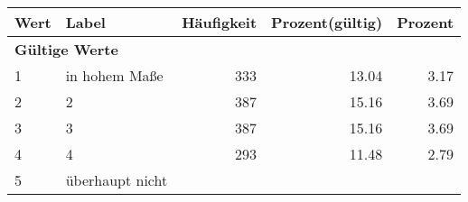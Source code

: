      \begin{longtable}{lXrrr}
     \toprule
     \textbf{Wert} & \textbf{Label} & \textbf{Häufigkeit} & \textbf{Prozent(gültig)} & \textbf{Prozent} \\
     \endhead
     \midrule
     \multicolumn{5}{l}{\textbf{Gültige Werte}}\\

     1 &
     \multicolumn{1}{X}{ in hohem Maße   } &


       \num{333} &
       \num[round-mode=places,round-precision=2]{13,04} &
         \num[round-mode=places,round-precision=2]{3,17} \\

     2 &
     \multicolumn{1}{X}{ 2   } &


       \num{387} &
       \num[round-mode=places,round-precision=2]{15,16} &
         \num[round-mode=places,round-precision=2]{3,69} \\

     3 &
     \multicolumn{1}{X}{ 3   } &


       \num{387} &
       \num[round-mode=places,round-precision=2]{15,16} &
         \num[round-mode=places,round-precision=2]{3,69} \\

     4 &
     \multicolumn{1}{X}{ 4   } &


       \num{293} &
       \num[round-mode=places,round-precision=2]{11,48} &
         \num[round-mode=places,round-precision=2]{2,79} \\

     5 &
     \multicolumn{1}{X}{ überhaupt nicht   } &



\end{longtable}
